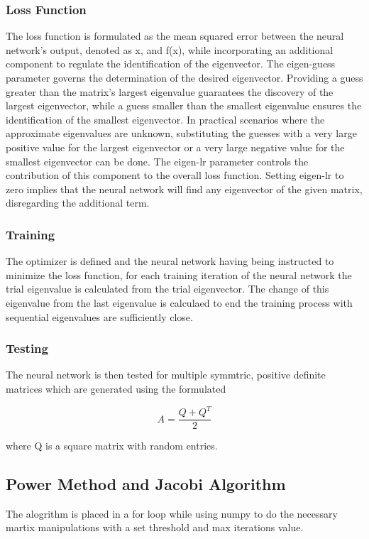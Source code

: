 \documentclass{article}
\begin{document}
\subsubsection{Loss Function}
The loss function is formulated as the mean squared error between the neural network's output, denoted as x, and f(x), while incorporating an additional component to regulate the identification of the eigenvector. The eigen-guess parameter governs the determination of the desired eigenvector. Providing a guess greater than the matrix's largest eigenvalue guarantees the discovery of the largest eigenvector, while a guess smaller than the smallest eigenvalue ensures the identification of the smallest eigenvector. In practical scenarios where the approximate eigenvalues are unknown, substituting the guesses with a very large positive value for the largest eigenvector or a very large negative value for the smallest eigenvector can be done. The eigen-lr parameter controls the contribution of this component to the overall loss function. Setting eigen-lr to zero implies that the neural network will find any eigenvector of the given matrix, disregarding the additional term.

\subsubsection{Training}
The optimizer is defined and the neural network having being instructed to minimize the loss function, for each training iteration of the neural network the trial eigenvalue is calculated from the trial eigenvector. The change of this eigenvalue from the last eigenvalue is calculaed to end the training process with sequential eigenvalues are sufficiently close. 

\subsubsection{Testing}
The neural network is then tested for multiple symmtric, positive definite matrices which are generated using the formulated

\[
    A = \frac{Q + Q^{T}}{2}  
\]

where Q is a square matrix with random entries.

\subsection{Power Method and Jacobi Algorithm}

The alogrithm is placed in a for loop while using numpy to do the necessary martix manipulations with a set threshold and max iterations value.
\end{document}
